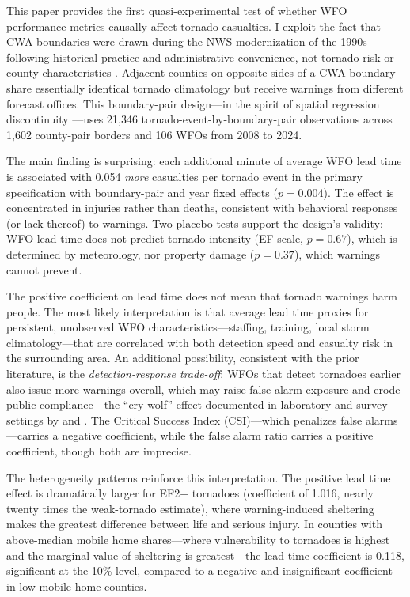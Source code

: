 \documentclass[12pt]{article}
\begin{document}
This paper provides the first quasi-experimental test of whether WFO performance metrics causally affect tornado casualties. I exploit the fact that CWA boundaries were drawn during the NWS modernization of the 1990s following historical practice and administrative convenience, not tornado risk or county characteristics \citep{uccellini2019}. Adjacent counties on opposite sides of a CWA boundary share essentially identical tornado climatology but receive warnings from different forecast offices. This boundary-pair design---in the spirit of spatial regression discontinuity \citep{keele2015}---uses 21,346 tornado-event-by-boundary-pair observations across 1,602 county-pair borders and 106 WFOs from 2008 to 2024.

The main finding is surprising: each additional minute of average WFO lead time is associated with 0.054 \textit{more} casualties per tornado event in the primary specification with boundary-pair and year fixed effects ($p = 0.004$). The effect is concentrated in injuries rather than deaths, consistent with behavioral responses (or lack thereof) to warnings. Two placebo tests support the design's validity: WFO lead time does not predict tornado intensity (EF-scale, $p = 0.67$), which is determined by meteorology, nor property damage ($p = 0.37$), which warnings cannot prevent.

The positive coefficient on lead time does not mean that tornado warnings harm people. The most likely interpretation is that average lead time proxies for persistent, unobserved WFO characteristics---staffing, training, local storm climatology---that are correlated with both detection speed and casualty risk in the surrounding area. An additional possibility, consistent with the prior literature, is the \textit{detection-response trade-off}: WFOs that detect tornadoes earlier also issue more warnings overall, which may raise false alarm exposure and erode public compliance---the ``cry wolf'' effect documented in laboratory and survey settings by \citet{simmons2009} and \citet{ripberger2015}. The Critical Success Index (CSI)---which penalizes false alarms---carries a negative coefficient, while the false alarm ratio carries a positive coefficient, though both are imprecise.

The heterogeneity patterns reinforce this interpretation. The positive lead time effect is dramatically larger for EF2+ tornadoes (coefficient of 1.016, nearly twenty times the weak-tornado estimate), where warning-induced sheltering makes the greatest difference between life and serious injury. In counties with above-median mobile home shares---where vulnerability to tornadoes is highest and the marginal value of sheltering is greatest---the lead time coefficient is 0.118, significant at the 10\% level, compared to a negative and insignificant coefficient in low-mobile-home counties.
\end{document}
